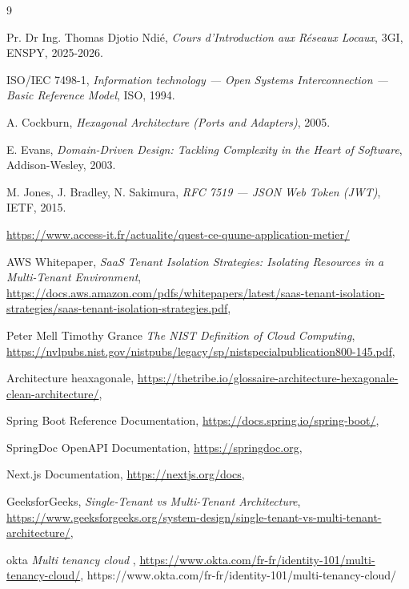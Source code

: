 \begin{thebibliography}{9}

Pr. Dr Ing. Thomas Djotio Ndié,
\emph{Cours d'Introduction aux Réseaux Locaux}, 3GI, ENSPY, 2025-2026.

ISO/IEC 7498-1,
\emph{Information technology --- Open Systems Interconnection --- Basic Reference Model},
ISO, 1994.

A. Cockburn,
\emph{Hexagonal Architecture (Ports and Adapters)}, 2005.

E. Evans,
\emph{Domain-Driven Design: Tackling Complexity in the Heart of Software},
Addison-Wesley, 2003.

M. Jones, J. Bradley, N. Sakimura,
\emph{RFC 7519 --- JSON Web Token (JWT)}, IETF, 2015.

\bibitem{}\url{https://www.access-it.fr/actualite/quest-ce-quune-application-metier/}

AWS Whitepaper,
\emph{SaaS Tenant Isolation Strategies: Isolating
Resources in a Multi-Tenant Environment}, 
\url{https://docs.aws.amazon.com/pdfs/whitepapers/latest/saas-tenant-isolation-strategies/saas-tenant-isolation-strategies.pdf}, 

Peter Mell Timothy Grance
\emph{The NIST Definition of Cloud Computing}, 
\url{https://nvlpubs.nist.gov/nistpubs/legacy/sp/nistspecialpublication800-145.pdf}, 



Architecture heaxagonale,
\url{https://thetribe.io/glossaire-architecture-hexagonale-clean-architecture/}, 


Spring Boot Reference Documentation,
\url{https://docs.spring.io/spring-boot/}, 

SpringDoc OpenAPI Documentation,
\url{https://springdoc.org},  

Next.js Documentation,
\url{https://nextjs.org/docs}, 

GeeksforGeeks,
\emph{Single-Tenant vs Multi-Tenant Architecture},
\url{https://www.geeksforgeeks.org/system-design/single-tenant-vs-multi-tenant-architecture/}, 

okta
\emph{Multi tenancy cloud },
\url{https://www.okta.com/fr-fr/identity-101/multi-tenancy-cloud/}, 
https://www.okta.com/fr-fr/identity-101/multi-tenancy-cloud/
\end{thebibliography}

